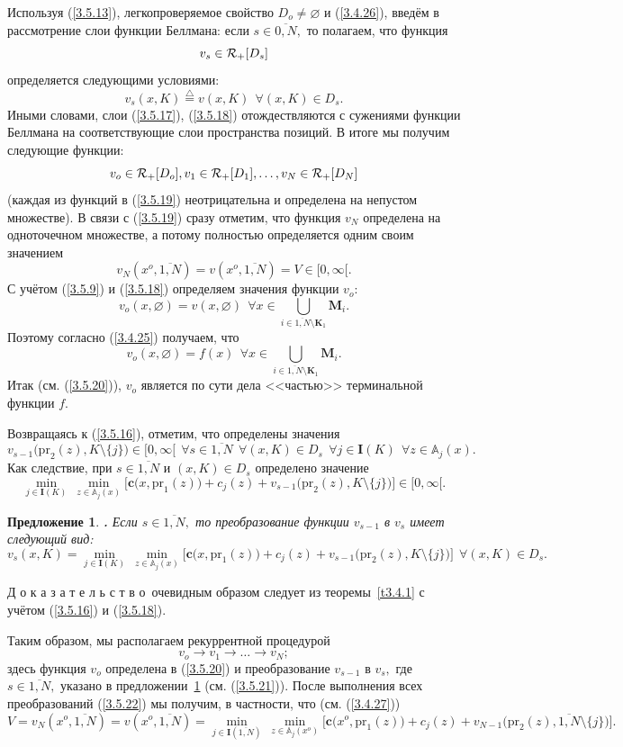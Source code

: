 \documentclass[12pt,twoside]{report}
\newcommand{\bfn}{\begin{equation}}
\newcommand{\efn}{\end{equation}}
\newcommand{\df}{\stackrel{\triangle}{=}}
\newcommand{\ov}{\overline}
\newcounter{theo}
\newcounter{pred}
\newtheorem{pred}{Предложение}[section]
\newcommand{\TL}{\mbox{\bf{$\!\!$.}}}
\newcommand{\sm}{\setminus}
\newcommand{\fa}{\forall}
\newcommand{\clr}{{\cal R}}
\newcommand{\bba}{{\mathbb A}}
\newcommand{\emp}{\varnothing}
\begin{document}
{Используя (\ref{3.5.13}), легкопроверяемое свойство $D_o\neq \emp$ и (\ref{3.4.26}), введём
в рассмотрение слои функции Беллмана: если $s\in \ov{0,N},$ то полагаем, что функция
\bfn\label{3.5.17}v_s\in \clr_+[D_s]
\efn
определяется следующими условиями:
\bfn\label{3.5.18}v_s(x,K) \df v(x,K)\ \ \fa (x,K)\in D_s.
\efn
Иными словами, слои (\ref{3.5.17}), (\ref{3.5.18}) отождествляются с сужениями  функции
Беллмана на соответствующие слои пространства позиций. В итоге мы получим следующие функции:
\bfn\label{3.5.19}v_o\in \clr_+[D_o], v_1\in \clr_+[D_1],\ldots,v_N\in \clr_+[D_N]
\efn
(каждая из функций в (\ref{3.5.19}) неотрицательна и определена на непустом множестве).
В связи с (\ref{3.5.19}) сразу отметим, что функция $v_N$ определена на одноточечном множестве,
а потому полностью определяется одним своим значением
$$
v_N(x^o,\ov{1,N})= v(x^o,\ov{1,N}) = V\in [0,\infty[.
$$
С учётом (\ref{3.5.9}) и (\ref{3.5.18}) определяем значения функции $v_o$:
$$
v_o(x,\emp) = v(x,\emp)\ \ \fa x\in \bigcup\limits_{i\in \ov{1,N}\sm \mathbf{K}_1}\mathbf{M}_i.
$$
Поэтому согласно (\ref{3.4.25}) получаем, что
\bfn\label{3.5.20}v_o(x,\emp) = f(x)\ \ \fa x\in \bigcup\limits_{i\in \ov{1,N}\sm
\mathbf{K}_1}\mathbf{M}_i.
\efn
Итак (см. (\ref{3.5.20})), $v_o$ является  по сути дела <<частью>> терминальной функции $f.$

Возвращаясь к (\ref{3.5.16}), отметим, что определены значения
$$v_{s-1}\bigl(\mathrm{pr}_2(z),K\sm\{j\}\bigl)\in [0,\infty[\ \ \fa s \in \ov{1,N}\ \ \fa
(x,K)\in D_s\ \ \fa j\in \mathbf{I}(K)\ \ \fa z\in \bba_j(x).$$
Как следствие, при $s\in \ov{1,N}$ и $(x,K)\in D_s$ определено значение
$$\min\limits_{j\in\mathbf{I}(K)}\ \min\limits_{z\in \bba_j(x)}\bigl[\mathbf{c}\bigl(x,
\mathrm{pr}_1(z)\bigl) + c_j(z) + v_{s-1}\bigl(\mathrm{pr}_2(z),K\sm\{j\}\bigl)\bigl]\in [0,\infty[.
$$
\begin{pred}\label{p3.5.1}{\TL} Если $s\in \ov{1,N},$ то преобразование функции
$v_{s-1}$ в $v_s$ имеет следующий вид:
\bfn\label{3.5.21}v_s(x,K) = \min\limits_{j\in \mathbf{I}(K)}\ \min\limits_{z\in \bba_j(x)}
\bigl[\mathbf{c}\bigl(x,\mathrm{pr}_1(z)\bigl) + c_j(z) + v_{s-1}\bigl(\mathrm{pr}_2(z),
K\sm\{j\}\bigl)\bigl]\ \ \fa (x,K) \in D_s.
\efn
\end{pred}

Д о к а з а т е л ь с т в о\, очевидным образом следует из теоремы~\ref{t3.4.1} с учётом
(\ref{3.5.16}) и (\ref{3.5.18}).

Таким образом, мы располагаем рекуррентной процедурой
\bfn\label{3.5.22}v_o \longrightarrow v_1 \longrightarrow \ldots \longrightarrow v_N;
\efn
здесь функция $v_o$ определена в (\ref{3.5.20}) и преобразование $v_{s-1}$ в $v_s,$
где $s\in \ov{1,N},$ указано в предложении~\ref{p3.5.1} (см. (\ref{3.5.21})). После
выполнения всех преобразований (\ref{3.5.22}) мы получим, в частности, что (см. (\ref{3.4.27}))
\bfn\label{3.5.23}V = v_N(x^o,\ov{1,N}) = v(x^o,\ov{1,N}) = \min\limits_{j\in \mathbf{I}(\overline{1,N})}\
\min\limits_{z\in \bba_j(x^o)} \bigl[\mathbf{c}\bigl(x^o,\mathrm{pr}_1(z)\bigl) + c_j(z) +
v_{N-1}\bigl(\mathrm{pr}_2(z),\ov{1,N}\sm\{j\}\bigl)\bigl].
\efn

}
\end{document}
